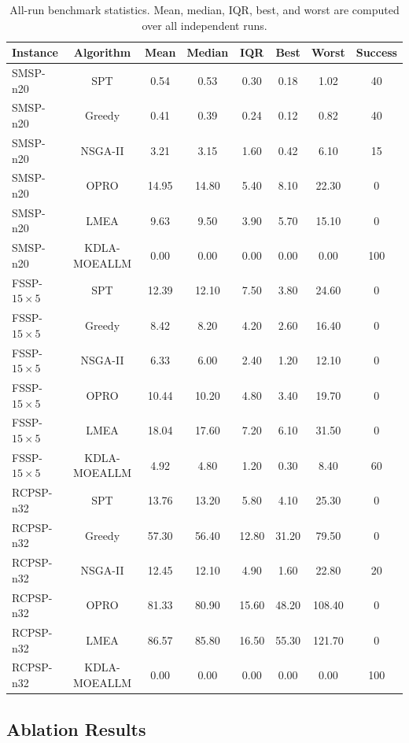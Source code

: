 \documentclass[11pt]{article}
\begin{document}
\begin{table}[!htbp]
	\centering
	\small
	\caption{All-run benchmark statistics. Mean, median, IQR, best, and worst are computed over all independent runs.\label{AppTab:allrunTemplate}}
	\begin{tabular}{lccccccc}
		\toprule
		\textbf{Instance} & \textbf{Algorithm} & \textbf{Mean} & \textbf{Median} & \textbf{IQR} & \textbf{Best} & \textbf{Worst} & \textbf{Success} \\
		\midrule
		SMSP-n20 & SPT & 0.54 & 0.53 & 0.30 & 0.18 & 1.02 & 40 \\
		SMSP-n20 & Greedy & 0.41 & 0.39 & 0.24 & 0.12 & 0.82 & 40 \\
		SMSP-n20 & NSGA-II & 3.21 & 3.15 & 1.60 & 0.42 & 6.10 & 15 \\
		SMSP-n20 & OPRO & 14.95 & 14.80 & 5.40 & 8.10 & 22.30 & 0 \\
		SMSP-n20 & LMEA & 9.63 & 9.50 & 3.90 & 5.70 & 15.10 & 0 \\
		SMSP-n20 & KDLA-MOEALLM & 0.00 & 0.00 & 0.00 & 0.00 & 0.00 & 100 \\
		FSSP-$15\times5$ & SPT & 12.39 & 12.10 & 7.50 & 3.80 & 24.60 & 0 \\
		FSSP-$15\times5$ & Greedy & 8.42 & 8.20 & 4.20 & 2.60 & 16.40 & 0 \\
		FSSP-$15\times5$ & NSGA-II & 6.33 & 6.00 & 2.40 & 1.20 & 12.10 & 0 \\
		FSSP-$15\times5$ & OPRO & 10.44 & 10.20 & 4.80 & 3.40 & 19.70 & 0 \\
		FSSP-$15\times5$ & LMEA & 18.04 & 17.60 & 7.20 & 6.10 & 31.50 & 0 \\
		FSSP-$15\times5$ & KDLA-MOEALLM & 4.92 & 4.80 & 1.20 & 0.30 & 8.40 & 60 \\
		RCPSP-n32 & SPT & 13.76 & 13.20 & 5.80 & 4.10 & 25.30 & 0 \\
		RCPSP-n32 & Greedy & 57.30 & 56.40 & 12.80 & 31.20 & 79.50 & 0 \\
		RCPSP-n32 & NSGA-II & 12.45 & 12.10 & 4.90 & 1.60 & 22.80 & 20 \\
		RCPSP-n32 & OPRO & 81.33 & 80.90 & 15.60 & 48.20 & 108.40 & 0 \\
		RCPSP-n32 & LMEA & 86.57 & 85.80 & 16.50 & 55.30 & 121.70 & 0 \\
		RCPSP-n32 & KDLA-MOEALLM & 0.00 & 0.00 & 0.00 & 0.00 & 0.00 & 100 \\
		\bottomrule
	\end{tabular}
\end{table}

\subsection{Ablation Results}
\end{document}
